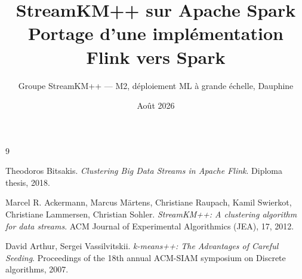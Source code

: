 \documentclass[a4paper,11pt]{report}
\title{StreamKM++ sur Apache Spark \\
  \large Portage d'une implémentation Flink vers Spark}
\author{%
  Groupe StreamKM++ --- M2, déploiement ML à grande échelle, Dauphine}
\date{Août 2026}
\begin{document}
\maketitle
\tableofcontents









\begin{thebibliography}{9}

Theodoros Bitsakis.
\emph{Clustering Big Data Streams in Apache Flink}.
Diploma thesis, 2018.

Marcel R. Ackermann, Marcus Märtens, Christiane Raupach, Kamil Swierkot,
Christiane Lammersen, Christian Sohler.
\emph{StreamKM++: A clustering algorithm for data streams}.
ACM Journal of Experimental Algorithmics (JEA), 17, 2012.

David Arthur, Sergei Vassilvitskii.
\emph{k-means++: The Advantages of Careful Seeding}.
Proceedings of the 18th annual ACM-SIAM symposium on Discrete algorithms, 2007.

\end{thebibliography}


\end{document}
